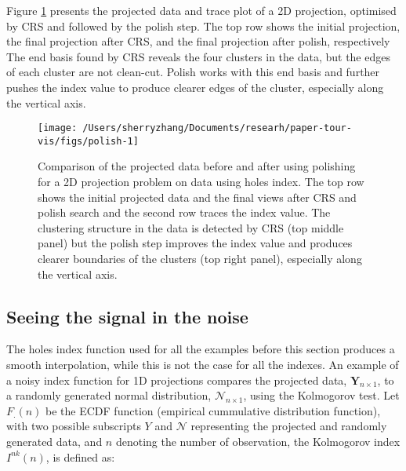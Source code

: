 Figure \ref{fig:polish} presents the projected data and trace plot of a
2D projection, optimised by CRS and followed by the polish step. The top
row shows the initial projection, the final projection after CRS, and
the final projection after polish, respectively The end basis found by
CRS reveals the four clusters in the data, but the edges of each cluster
are not clean-cut. Polish works with this end basis and further pushes
the index value to produce clearer edges of the cluster, especially
along the vertical axis.

\begin{Schunk}
\begin{figure}

{\centering \texttt{[image: /Users/sherryzhang/Documents/researh/paper-tour-vis/figs/polish-1]} 

}

\caption[Comparison of the projected data before and after using polishing for a 2D projection problem on  data using holes index]{Comparison of the projected data before and after using polishing for a 2D projection problem on  data using holes index. The top row shows the initial projected data and the final views after CRS and polish search and the second row traces the index value. The clustering structure in the data is detected by CRS (top middle panel) but the polish step improves the index value and produces clearer boundaries of the clusters (top right panel), especially along the vertical axis.}\label{fig:polish}
\end{figure}
\end{Schunk}

\hypertarget{seeing-the-signal-in-the-noise}{%
\subsection{Seeing the signal in the
noise}\label{seeing-the-signal-in-the-noise}}

The holes index function used for all the examples before this section
produces a smooth interpolation, while this is not the case for all the
indexes. An example of a noisy index function for 1D projections
compares the projected data, \(\mathbf{Y}_{n \times 1}\), to a randomly
generated normal distribution, \(\mathcal{N}_{n \times 1}\), using the
Kolmogorov test. Let \(F_{.}(n)\) be the ECDF function (empirical
cummulative distribution function), with two possible subscripts \(Y\)
and \(\mathcal{N}\) representing the projected and randomly generated
data, and \(n\) denoting the number of observation, the Kolmogorov index
\(I^{nk}(n)\), is defined as:

